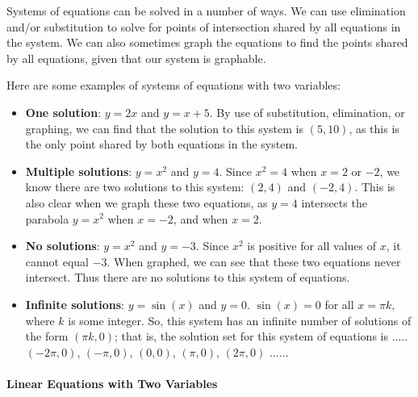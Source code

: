 Systems of equations can be solved in a number of ways. We can use elimination and/or substitution to solve for points of intersection shared by all equations in the system. We can also sometimes graph the equations to find the points shared by all equations, given that our system is graphable.

Here are some examples of systems of equations with two variables:

\begin{itemize}
    \item \textbf{One solution}: $y = 2x$ and $y = x + 5$. By use of substitution, elimination, or graphing, we can find that the solution to this system is $(5, 10)$, as this is the only point shared by both equations in the system.
\end{itemize}

\begin{itemize}
    \item \textbf{Multiple solutions}: $y = x^2$ and $y = 4$. Since $x^2 = 4$ when $x = 2$ or $-2$, we know there are two solutions to this system: $(2, 4)$ and $(-2, 4)$. This is also clear when we graph these two equations, as $y = 4$ intersects the parabola $y = x^2$ when $x = -2$, and when $x = 2$.
\end{itemize}

\begin{itemize}
    \item \textbf{No solutions}: $y = x^2$ and $y = -3$. Since $x^2$ is positive for all values of $x$, it cannot equal $-3$. When graphed, we can see that these two equations never intersect. Thus there are no solutions to this system of equations.
\end{itemize}

\begin{itemize}
    \item \textbf{Infinite solutions}: $y = \sin(x)$ and $y = 0$. $\sin(x) = 0$ for all $x = \pi k$, where $k$ is some integer. So, this system has an infinite number of solutions of the form $(\pi k, 0)$; that is, the solution set for this system of equations is {..... $( -2\pi , 0 )$, $( -\pi , 0 )$, $( 0 , 0 )$, $( \pi , 0 )$, $( 2\pi , 0 )$ .....}.
\end{itemize}

\paragraph{Linear Equations with Two Variables}

